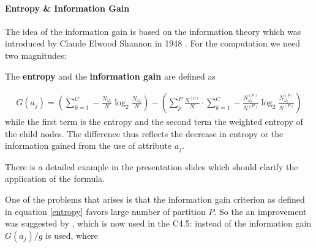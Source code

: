 \paragraph{Entropy \& Information Gain}

The idea of the information gain is based on the information theory which was introduced by Claude Elwood Shannon in 1948 \cite{shannon2001mathematical}. For the computation we need two magnitudes: 


\begin{definition}
The \textbf{entropy} and the \textbf{information gain} are defined as

\begin{align}
    G(a_j) = \left( \sum_{k=1}^C -  \frac{N_{\omega_k}}{N} \log_2 \frac{N_{\omega_k}}{N}  \right) - \left( \sum_{p}^P \frac{N^{(p)}}{N} \cdot \sum_{k=1}^C -  \frac{N^{(p)}_{\omega_k}}{N^{(P)}} \log_2 \frac{N^{(p)}_{\omega_k}}{N^{(P)}} \right) \label{entropy}
\end{align}
while the first term is the entropy and the second term the weighted entropy of the child nodes. The difference thus reflects the decrease in entropy or the information gained from the use of attribute $a_j$.


\end{definition}


\begin{remark}
    There is a detailed example in the presentation slides which should clarify the application of the formula.
\end{remark}


One of the problems that arises is that the information gain criterion as defined in equation \ref{entropy} favors large number of partition $P$. So the an improvement was suggested by \cite{quinlan1993c4}, which is now used in the C4.5: instead of the information gain $G(a_j) / g$ is used, where

